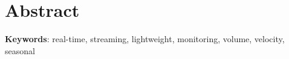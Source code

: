 \chapter*{Abstract}

 




\vspace*{10mm}\noindent
\textbf{Keywords}: real-time, streaming, lightweight, monitoring, volume, velocity, seasonal

